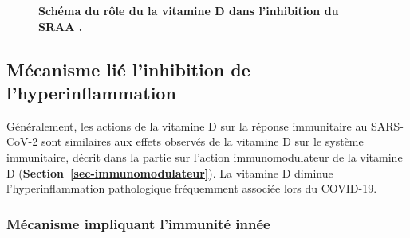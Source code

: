 \documentclass[
  a4paper,
  DIV=11,
  numbers=noendperiod,
  listof=totoc]{scrreprt}
\begin{document}
\begin{figure}


\caption[Schéma du rôle du la vitamine D dans l'inhibition du
SRAA.]{\label{fig-vd-ras}\textbf{Schéma du rôle du la vitamine D dans
l'inhibition du SRAA \autocite{Borsche.2021}.}}

\end{figure}%

\subsection{Mécanisme lié l'inhibition de
l'hyperinflammation}\label{muxe9canisme-liuxe9-linhibition-de-lhyperinflammation}

Généralement, les actions de la vitamine D sur la réponse immunitaire au
SARS-CoV-2 sont similaires aux effets observés de la vitamine D sur le
système immunitaire, décrit dans la partie sur l'action immunomodulateur
de la vitamine D (\textbf{Section~\ref{sec-immunomodulateur}}). La
vitamine D diminue l'hyperinflammation pathologique fréquemment associée
lors du COVID-19.

\subsubsection{Mécanisme impliquant l'immunité
innée}\label{muxe9canisme-impliquant-limmunituxe9-innuxe9e}
\end{document}
